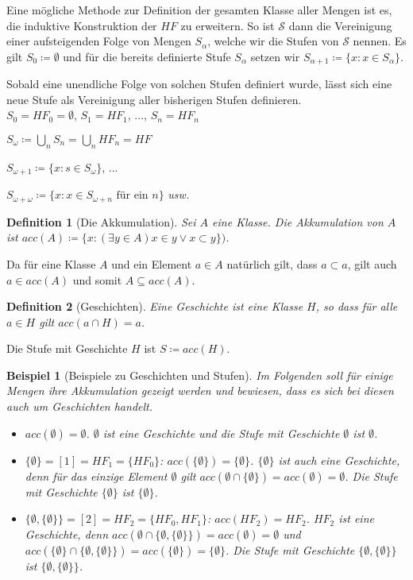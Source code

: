 \documentclass[german]{article}
\theoremstyle{break}
\newtheorem{example}{Beispiel}[section]
\theoremstyle{def_style}
\newtheorem{definition}{Definition}[section]
\theoremstyle{def_style}
\theoremstyle{lemma_style}
\begin{document}
Eine mögliche Methode zur Definition der gesamten Klasse aller Mengen ist es, die induktive Konstruktion der $HF$ zu erweitern. So ist $\mathcal{S}$ dann die Vereinigung einer aufsteigenden Folge von Mengen $S_\alpha$, welche wir die Stufen von $\mathcal{S}$ nennen. Es gilt $S_0\coloneqq \emptyset$ und für die bereits definierte Stufe $S_\alpha$ setzen wir $S_{\alpha +1}\coloneqq\{x : x\in S_\alpha\}$.

Sobald eine unendliche Folge von solchen Stufen definiert wurde, lässt sich eine neue Stufe als Vereinigung aller bisherigen Stufen definieren.\\

$S_0=HF_0=\emptyset$, $S_1=HF_1$, $\dots$, $S_n=HF_n$

$S_\omega \coloneqq \bigcup\limits_n S_n = \bigcup\limits_n HF_n = HF$

$S_{\omega+1}\coloneqq\{x : s\in S_\omega\}$, $\dots$

$S_{\omega+\omega}\coloneqq\{x : x \in S_{\omega+n} \text{ für ein } n\}$ \textit{usw.}

\begin{definition}[Die Akkumulation]
	Sei $A$ eine Klasse. Die \textit{Akkumulation} von $A$ ist $acc(A)\coloneqq\{x : (\exists y \in A) x\in y\lor x \subset y\})$.
\end{definition}

Da für eine Klasse $A$ und ein Element $a\in A$ natürlich gilt, dass $a \subset a$, gilt auch $a\in acc(A)$ und somit $A\subseteq acc(A)$.

\begin{definition}[Geschichten]
	Eine \textit{Geschichte} ist eine Klasse $H$, so dass für alle $a\in H$ gilt $acc(a\cap H)=a$.
\end{definition}

Die Stufe mit Geschichte $H$ ist $S\coloneqq acc(H)$.

\begin{example}[Beispiele zu Geschichten und Stufen]
	Im Folgenden soll für einige Mengen ihre Akkumulation gezeigt werden und bewiesen, dass es sich bei diesen auch um Geschichten handelt.
	\begin{itemize}
		\item $acc(\emptyset)=\emptyset$. $\emptyset$ ist eine Geschichte und die Stufe mit Geschichte $\emptyset$ ist $\emptyset$.
		\item $\{\emptyset\} = [1] = HF_1 = \{HF_0\}$: $acc(\{\emptyset\}) = \{\emptyset\}$. 
		$\{\emptyset\}$ ist auch eine Geschichte, denn für das einzige Element $\emptyset$ gilt $acc(\emptyset \cap \{\emptyset\})=acc(\emptyset)=\emptyset$. 
		Die Stufe mit Geschichte $\{\emptyset\}$ ist $\{\emptyset\}$.
		\item $\{\emptyset, \{\emptyset\}\}=[2]=HF_2=\{HF_0, HF_1\}$: $acc(HF_2)=HF_2$.
		$HF_2$ ist eine Geschichte, denn $acc(\emptyset \cap \{\emptyset, \{\emptyset\}\})=acc(\emptyset)=\emptyset$ und $acc(\{\emptyset\}\cap \{\emptyset, \{\emptyset\}\})=acc(\{\emptyset\})=\{\emptyset\}$. Die Stufe mit Geschichte $\{\emptyset, \{\emptyset\}\}$ ist $\{\emptyset, \{\emptyset\}\}$.
	\end{itemize}
\label{GeschichtenBsp}
\end{example}
\end{document}
